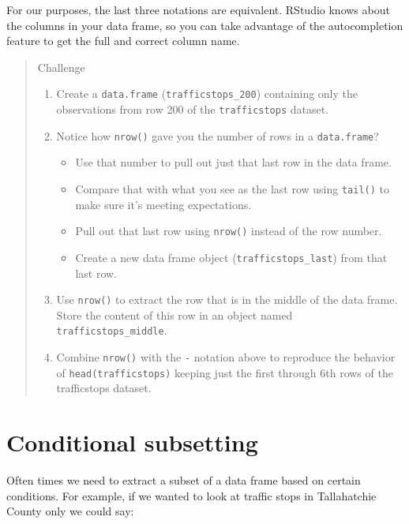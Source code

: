 \documentclass[]{book}
\providecommand{\tightlist}{%
  \setlength{\itemsep}{0pt}\setlength{\parskip}{0pt}}
\theoremstyle{definition}
\theoremstyle{definition}
\theoremstyle{remark}
\begin{document}
For our purposes, the last three notations are equivalent. RStudio knows
about the columns in your data frame, so you can take advantage of the
autocompletion feature to get the full and correct column name.

\begin{quote}
Challenge

\begin{enumerate}
\def\labelenumi{\arabic{enumi}.}
\item
  Create a \texttt{data.frame} (\texttt{trafficstops\_200}) containing
  only the observations from row 200 of the \texttt{trafficstops}
  dataset.
\item
  Notice how \texttt{nrow()} gave you the number of rows in a
  \texttt{data.frame}?

  \begin{itemize}
  \tightlist
  \item
    Use that number to pull out just that last row in the data frame.
  \item
    Compare that with what you see as the last row using \texttt{tail()}
    to make sure it's meeting expectations.
  \item
    Pull out that last row using \texttt{nrow()} instead of the row
    number.
  \item
    Create a new data frame object (\texttt{trafficstops\_last}) from
    that last row.
  \end{itemize}
\item
  Use \texttt{nrow()} to extract the row that is in the middle of the
  data frame. Store the content of this row in an object named
  \texttt{trafficstops\_middle}.
\item
  Combine \texttt{nrow()} with the \texttt{-} notation above to
  reproduce the behavior of \texttt{head(trafficstops)} keeping just the
  first through 6th rows of the trafficstops dataset.
\end{enumerate}
\end{quote}

\section{Conditional subsetting}\label{conditional-subsetting-1}

Often times we need to extract a subset of a data frame based on certain
conditions. For example, if we wanted to look at traffic stops in
Tallahatchie County only we could say:
\end{document}
